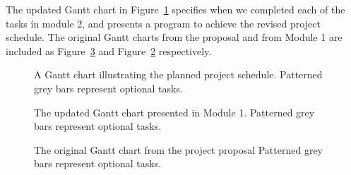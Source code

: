\documentclass[11pt]{scrartcl} %
\begin{document}
    The updated Gantt chart in Figure~\ref{gantt:module2} specifies when
    we completed each of the tasks in module 2, and
    presents a program to achieve the revised project schedule.
    The original Gantt charts from the proposal and from Module 1 are included as Figure~\ref{gantt:proposal} and Figure~\ref{gantt:module1} respectively.

    \begin{figure}[H]
        \makebox[\textwidth][c]{\resizebox{0.95\paperwidth}{!}{}}
        \caption[Project Schedule]{
            A Gantt chart illustrating the planned project schedule.
            Patterned grey bars represent optional tasks.
        }
        \label{gantt:module2}
    \end{figure}

    \begin{figure}[H]
        \makebox[\textwidth][c]{\resizebox{0.95\paperwidth}{!}{}}
        \caption[Module 1 Schedule]{
            The updated Gantt chart presented in Module 1.
            Patterned grey bars represent optional tasks.
        }
        \label{gantt:module1}
    \end{figure}

    \begin{figure}[H]
        \makebox[\textwidth][c]{\resizebox{0.95\paperwidth}{!}{}}
        \caption[Proposal Schedule]{
            The original Gantt chart from the project proposal
            Patterned grey bars represent optional tasks.
        }
        \label{gantt:proposal}
    \end{figure}
\end{document}
